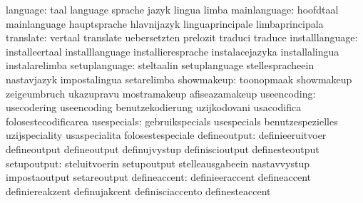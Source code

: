                         language: taal                             language
                                  sprache                          jazyk
                                  lingua                           limba
                    mainlanguage: hoofdtaal                        mainlanguage
                                  hauptsprache                     hlavnijazyk
                                  linguaprincipale                 limbaprincipala
                       translate: vertaal                          translate
                                  uebersetzten                     prelozit
                                  traduci                          traduce
                 installlanguage: installeertaal                   installlanguage
                                  installieresprache               instalacejazyka
                                  installalingua                   instalarelimba
                   setuplanguage: steltaalin                       setuplanguage
                                  stellespracheein                 nastavjazyk
                                  impostalingua                    setarelimba
                      showmakeup: toonopmaak                       showmakeup
                                  zeigeumbruch                     ukazupravu
                                  mostramakeup                     afiseazamakeup
                     useencoding: usecodering                      useencoding
                                  benutzekodierung                 uzijkodovani
                                  usacodifica                      folosestecodificarea
                     usespecials: gebruikspecials                  usespecials
                                  benutzespezielles                uzijspeciality
                                  usaspecialita                    folosestespeciale
                    defineoutput: definieeruitvoer                 defineoutput
                                  defineoutput                     definujvystup
                                  definiscioutput                  definesteoutput
                     setupoutput: steluitvoerin                    setupoutput
                                  stelleausgabeein                 nastavvystup
                                  impostaoutput                    setareoutput
                    defineaccent: definieeraccent                  defineaccent
                                  definiereakzent                  definujakcent
                                  definisciaccento                 definesteaccent
